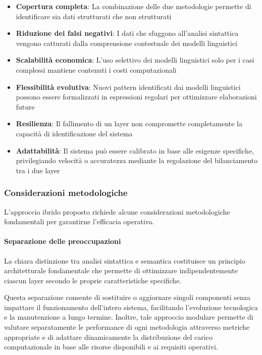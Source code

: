 \documentclass[12pt]{report}
\begin{document}
\begin{itemize}
    \item \textbf{Copertura completa}: La combinazione delle due metodologie permette di identificare sia dati strutturati che non strutturati

    \item \textbf{Riduzione dei falsi negativi}: I dati che sfuggono all'analisi sintattica vengono catturati dalla comprensione contestuale dei modelli linguistici

    \item \textbf{Scalabilità economica}: L'uso selettivo dei modelli linguistici solo per i casi complessi mantiene contenuti i costi computazionali

    \item \textbf{Flessibilità evolutiva}: Nuovi pattern identificati dai modelli linguistici possono essere formalizzati in espressioni regolari per ottimizzare elaborazioni future

    \item \textbf{Resilienza}: Il fallimento di un layer non compromette completamente la capacità di identificazione del sistema

    \item \textbf{Adattabilità}: Il sistema può essere calibrato in base alle esigenze specifiche, privilegiando velocità o accuratezza mediante la regolazione del bilanciamento tra i due layer
\end{itemize}

\subsubsection{Considerazioni metodologiche}

L'approccio ibrido proposto richiede alcune considerazioni metodologiche fondamentali per garantirne l'efficacia operativa.

\paragraph{Separazione delle preoccupazioni}
La chiara distinzione tra analisi sintattica e semantica costituisce un principio architetturale fondamentale che permette di ottimizzare indipendentemente ciascun layer secondo le proprie caratteristiche specifiche.

Questa separazione consente di sostituire o aggiornare singoli componenti senza impattare il funzionamento dell'intero sistema, facilitando l'evoluzione tecnologica e la manutenzione a lungo termine. Inoltre, tale approccio modulare permette di valutare separatamente le performance di ogni metodologia attraverso metriche appropriate e di adattare dinamicamente la distribuzione del carico computazionale in base alle risorse disponibili e ai requisiti operativi.
\end{document}
